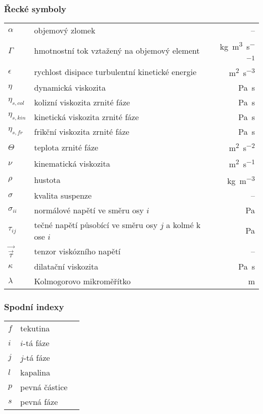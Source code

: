 \subsubsection*{Řecké symboly}
\begin{tabularx}{\textwidth}{@{}p{1.0cm} X r@{}}

$\alpha$ & objemový zlomek& --\\
$\Gamma$ & hmotnostní tok vztažený na objemový element & \si{\kilogram\per\cubic\meter\per\second} \\ 
$\epsilon$ & rychlost disipace turbulentní kinetické energie & \si{\meter\squared\per\second\cubed}\\
$\eta$ & dynamická viskozita & \si{\pascal\second}\\
$\eta_{s,col}$ & kolizní viskozita zrnité fáze & \si{\pascal\second}\\
$\eta_{s,kin}$ & kinetická viskozita zrnité fáze & \si{\pascal\second}\\
$\eta_{s,fr}$ & frikční viskozita zrnité fáze & \si{\pascal\second}\\
$\Theta$ & teplota zrnité fáze & \si{\meter\squared\per\second\squared} \\
$\nu$ & kinematická viskozita & \si{\meter\squared\per\second}\\
$\rho$ & hustota & \si{\kilogram\per\cubic\meter} \\
$\sigma$ & kvalita suspenze & -- \\
$\sigma_{ii}$ & normálové napětí ve směru osy $i$ & \si{\pascal} \\
$\tau_{ij}$ & tečné napětí působící ve směru osy $j$ a kolmé k ose $i$ & \si{\pascal} \\
$\vec{\vec{\tau}}$ & tenzor viskózního napětí & -- \\
$\kappa$ & dilatační viskozita & \si{\pascal\second}\\
$\lambda$ & Kolmogorovo mikroměřítko & \si{\meter}\\

\end{tabularx}

\subsubsection*{Spodní indexy}
\begin{tabularx}{\textwidth}{@{}p{1.0cm} X r@{}}

$f$ & tekutina & \\
$i$ & $i$-tá fáze & \\
$j$ & $j$-tá fáze & \\
$l$ & kapalina & \\
$p$ & pevná částice & \\
$s$ & pevná fáze & \\
\end{tabularx}

